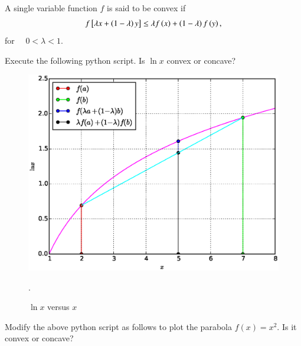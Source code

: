 
A single variable function $f$ is said to be convex if
%
\begin{align}
\label{ch1_convex_def}
f{}\left[\lambda x + \left(1-\lambda\right)y\right] \leq \lambda f\left(x\right) + \left(1-\lambda\right)f\left(y\right), 
\end{align}
%
for $\quad 0 < \lambda < 1$.
\begin{problem}
Execute the following python script. Is  $\ln x$ convex or  concave?
\end{problem}
%

%
\begin{figure}[h]
\centering
\includegraphics[width=\columnwidth]{./chapter1/figs/1.1.eps}
\caption{ $\ln x$ versus $x$}.
\label{fig.1.1}	
\end{figure}
%
\begin{problem}
Modify the above python script as follows to plot the parabola $f(x) = x^2$. Is it convex or concave?
\end{problem}

%
